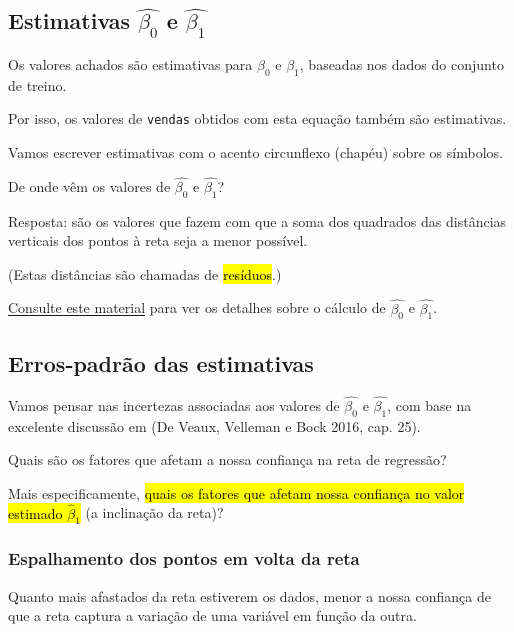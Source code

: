 \documentclass[
  letterpaper,
  DIV=11,
  numbers=noendperiod]{scrreprt}
\begin{document}
\subsection{\texorpdfstring{Estimativas $\hat{\beta_0}$ e
$\hat{\beta_1}$}{Estimativas  e }}\label{estimativas-hatbeta_0-e-hatbeta_1}

Os valores achados são estimativas para $\beta_0$ e $\beta_1$, baseadas
nos dados do conjunto de treino.

Por isso, os valores de \texttt{vendas} obtidos com esta equação também
são estimativas.

Vamos escrever estimativas com o acento circunflexo (chapéu) sobre os
símbolos.

De onde vêm os valores de $\hat{\beta_0}$ e $\hat{\beta_1}$?

Resposta: são os valores que fazem com que a soma dos quadrados das
distâncias verticais dos pontos à reta seja a menor possível.

(Estas distâncias são chamadas de {\hl{resíduos}}.)

\href{https://fnaufel.github.io/probestr/regr.html\#como-achar-a-equa\%C3\%A7\%C3\%A3o-da-melhor-reta-com-c\%C3\%A1lculo}{Consulte
este material} para ver os detalhes sobre o cálculo de $\hat{\beta_0}$ e
$\hat{\beta_1}$.

\subsection{Erros-padrão das
estimativas}\label{erros-padruxe3o-das-estimativas}

Vamos pensar nas incertezas associadas aos valores de $\hat{\beta_0}$ e
$\hat{\beta_1}$, com base na excelente discussão em (De Veaux, Velleman
e Bock 2016, cap. 25).

Quais são os fatores que afetam a nossa confiança na reta de regressão?

Mais especificamente, {\hl{quais os fatores que afetam nossa confiança
no valor estimado $\hat\beta_1$}} (a inclinação da reta)?

\subsubsection{Espalhamento dos pontos em volta da
reta}\label{espalhamento-dos-pontos-em-volta-da-reta}

Quanto mais afastados da reta estiverem os dados, menor a nossa
confiança de que a reta captura a variação de uma variável em função da
outra.
\end{document}
